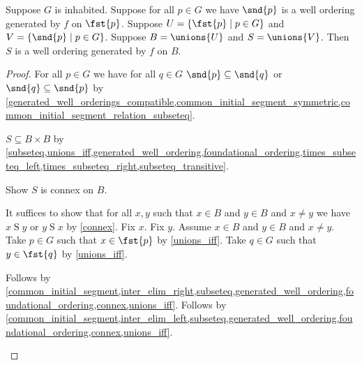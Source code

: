 \begin{lemma}\label{union_generated_well_orderings}
    Suppose $G$ is inhabited.
    Suppose for all $p\in G$ we have $\snd{p}$ is a well ordering generated by $f$ on $\fst{p}$.
    Suppose $U=\{\fst{p}\mid p\in G\}$ and $V=\{\snd{p}\mid p\in G\}$.
    Suppose $B=\unions{U}$ and $S=\unions{V}$.
    Then $S$ is a well ordering generated by $f$ on $B$.
\end{lemma}
\begin{proof}
    For all $p\in G$ we have for all $q\in G$
        $\snd{p}\subseteq\snd{q}$ or $\snd{q}\subseteq\snd{p}$
        by \cref{generated_well_orderings_compatible,common_initial_segment_symmetric,common_initial_segment_relation_subseteq}.

    $S\subseteq B\times B$
        by \cref{subseteq,unions_iff,generated_well_ordering,foundational_ordering,times_subseteq_left,times_subseteq_right,subseteq_transitive}.

    Show $S$ is connex on $B$.
    \begin{subproof}
        It suffices to show that for all $x,y$ such that $x\in B$ and $y\in B$ and $x\neq y$
            we have $x\mathrel{S}y$ or $y\mathrel{S}x$ by \cref{connex}.
        Fix $x$.
        Fix $y$.
        Assume $x\in B$ and $y\in B$ and $x\neq y$.
        Take $p\in G$ such that $x\in\fst{p}$ by \cref{unions_iff}.
        Take $q\in G$ such that $y\in\fst{q}$ by \cref{unions_iff}.
        \begin{byCase}
            Follows by \cref{common_initial_segment,inter_elim_right,subseteq,generated_well_ordering,foundational_ordering,connex,unions_iff}.
            Follows by \cref{common_initial_segment,inter_elim_left,subseteq,generated_well_ordering,foundational_ordering,connex,unions_iff}.
        \end{byCase}
    \end{subproof}


\end{proof}
